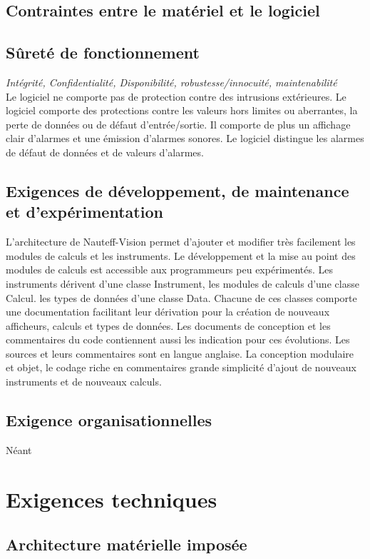 \documentclass[a4paper,11pt]{report}
\begin{document}
\subsection{Contraintes entre le matériel et le logiciel}
\subsection{Sûreté de fonctionnement}
\textit{Intégrité, Confidentialité, Disponibilité, robustesse/innocuité, maintenabilité}
\\
Le logiciel ne comporte pas de protection contre des intrusions extérieures.
Le logiciel comporte des protections contre
les valeurs hors limites ou aberrantes,
la perte de données ou de défaut d'entrée/sortie.
Il comporte de plus un affichage clair d'alarmes et une émission d'alarmes sonores.
Le logiciel distingue les alarmes de défaut de données et de valeurs d'alarmes.

\subsection{Exigences de développement, de maintenance et d'expérimentation}

L'architecture de Nauteff-Vision permet d'ajouter et modifier très facilement
les modules de calculs et les instruments.
Le développement et la mise au point des modules de calculs est accessible aux programmeurs peu expérimentés.
Les instruments dérivent d'une classe Instrument,
les modules de calculs d'une classe Calcul.
les types de données d'une classe Data.
Chacune de ces classes comporte une documentation facilitant leur dérivation
pour la création de nouveaux afficheurs, calculs et types de données.
Les documents de conception et les commentaires du code
contiennent aussi les indication pour ces évolutions.
Les sources et leurs commentaires sont en langue anglaise.
La conception modulaire et objet, le codage riche en commentaires
grande simplicité d'ajout de nouveaux instruments et de nouveaux calculs.

\subsection{Exigence organisationnelles}
Néant

\section{Exigences techniques}
\subsection{Architecture matérielle imposée}
\end{document}
